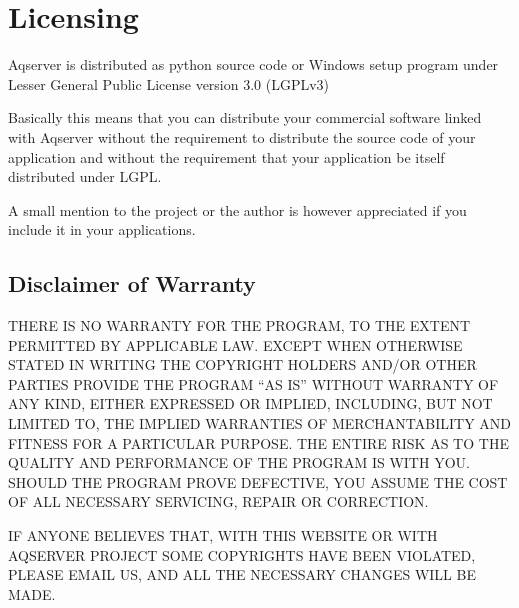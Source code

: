 \documentclass[a4paper,10pt,english]{sphinxmanual}
\begin{document}
\chapter{Licensing}
\label{license::doc}\label{license:licensing}
Aqserver is distributed as python source code or Windows setup program under Lesser General Public License version 3.0 (LGPLv3)

Basically this means that you can distribute your commercial software linked with Aqserver without the requirement to distribute the source code of your application and without the requirement that your application be itself distributed under LGPL.

A small mention to the project or the author is however appreciated if you include it in your applications.


\section{Disclaimer of Warranty}
\label{license:disclaimer-of-warranty}
THERE IS NO WARRANTY FOR THE PROGRAM, TO THE EXTENT PERMITTED BY APPLICABLE LAW. EXCEPT WHEN OTHERWISE STATED IN WRITING THE COPYRIGHT HOLDERS AND/OR OTHER PARTIES PROVIDE THE PROGRAM ``AS IS'' WITHOUT WARRANTY OF ANY KIND, EITHER EXPRESSED OR IMPLIED, INCLUDING, BUT NOT LIMITED TO, THE IMPLIED WARRANTIES OF MERCHANTABILITY AND FITNESS FOR A PARTICULAR PURPOSE. THE ENTIRE RISK AS TO THE QUALITY AND PERFORMANCE OF THE PROGRAM IS WITH YOU. SHOULD THE PROGRAM PROVE DEFECTIVE, YOU ASSUME THE COST OF ALL NECESSARY SERVICING, REPAIR OR CORRECTION.

IF ANYONE BELIEVES THAT, WITH THIS WEBSITE OR WITH AQSERVER PROJECT SOME COPYRIGHTS HAVE BEEN VIOLATED, PLEASE EMAIL US, AND ALL THE NECESSARY CHANGES WILL BE MADE.



\renewcommand{\indexname}{Index}
\printindex
\end{document}
